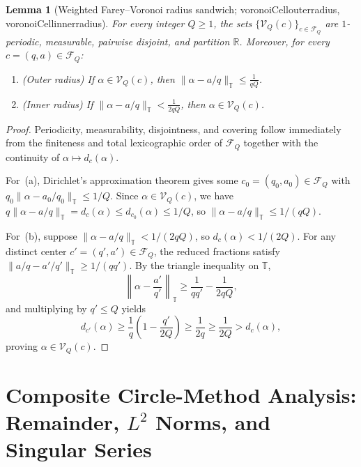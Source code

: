 \documentclass[11pt,reqno]{amsart}
\numberwithin{equation}{section}
\newtheorem{lemma}[theorem]{Lemma}
\theoremstyle{definition}
\newcommand{\R}{\mathbb{R}}
\newcommand{\T}{\mathbb{T}}
\newcommand{\1}{\mathbf{1}}
\newcommand{\V}{\mathcal{V}}
\newcommand{\lean}[1]{{\footnotesize\ttfamily\renewcommand{\_}{\textunderscore\allowbreak}#1}}
\begin{document}
\begin{lemma}[Weighted Farey--Voronoi radius sandwich; \lean{voronoiCell\_outer\_radius}, \lean{voronoiCell\_inner\_radius}]
\label{lem:voronoi}
For every integer $Q \ge 1$, the sets $\{\V_Q(c)\}_{c \in \mathcal{F}_Q}$ are $1$-periodic, measurable, pairwise disjoint, and partition $\R$. Moreover, for every $c = (q, a) \in \mathcal{F}_Q$:
\begin{enumerate}[label=(\alph*)]
  \item \emph{(Outer radius)} If $\alpha \in \V_Q(c)$, then $\|\alpha - a/q\|_\T \le \frac{1}{q Q}$.
  \item \emph{(Inner radius)} If $\|\alpha - a/q\|_\T < \frac{1}{2 q Q}$, then $\alpha \in \V_Q(c)$.
\end{enumerate}
\end{lemma}

\begin{proof}
Periodicity, measurability, disjointness, and covering follow immediately from the finiteness and total lexicographic order of $\mathcal{F}_Q$ together with the continuity of $\alpha \mapsto d_c(\alpha)$.

For~(a), Dirichlet's approximation theorem gives some $c_0 = (q_0, a_0) \in \mathcal{F}_Q$ with $q_0 \|\alpha - a_0/q_0\|_\T \le 1/Q$. Since $\alpha \in \V_Q(c)$, we have $q \|\alpha - a/q\|_\T = d_c(\alpha) \le d_{c_0}(\alpha) \le 1/Q$, so $\|\alpha - a/q\|_\T \le 1/(qQ)$.

For~(b), suppose $\|\alpha - a/q\|_\T < 1/(2qQ)$, so $d_c(\alpha) < 1/(2Q)$. For any distinct center $c' = (q', a') \in \mathcal{F}_Q$, the reduced fractions satisfy $\|a/q - a'/q'\|_\T \ge 1/(q q')$. By the triangle inequality on $\T$,
\[
  \left\|\alpha - \frac{a'}{q'}\right\|_\T \ge \frac{1}{q q'} - \frac{1}{2 q Q},
\]
and multiplying by $q' \le Q$ yields
\[
  d_{c'}(\alpha) \ge \frac{1}{q}\!\left(1 - \frac{q'}{2 Q}\right) \ge \frac{1}{2 q} \ge \frac{1}{2 Q} > d_c(\alpha),
\]
proving $\alpha \in \V_Q(c)$.
\end{proof}

\section{Composite Circle-Method Analysis: Remainder, \texorpdfstring{$L^2$}{L2} Norms, and Singular Series}
\label{sec:circle-method}
\end{document}
